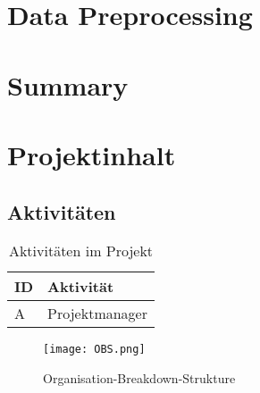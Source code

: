 \section{Data Preprocessing}

\section{Summary}


\section{Projektinhalt}
\subsection{Aktivitäten}
\begin{table}[H]
    \renewcommand{\arraystretch}{1.05}
    \begin{center}
        \begin{tabular}{l|l}
            \hline
            \textbf{ID} & \textbf{Aktivität}\\\hline
            A & Projektmanager\\ \hline
        \end{tabular}
        \caption{Aktivitäten im Projekt}
    \end{center}
\end{table}

\begin{figure}[H]
    \begin{center}
        \texttt{[image: OBS.png]}
    \end{center}
    \caption{Organisation-Breakdown-Strukture}
\end{figure}






